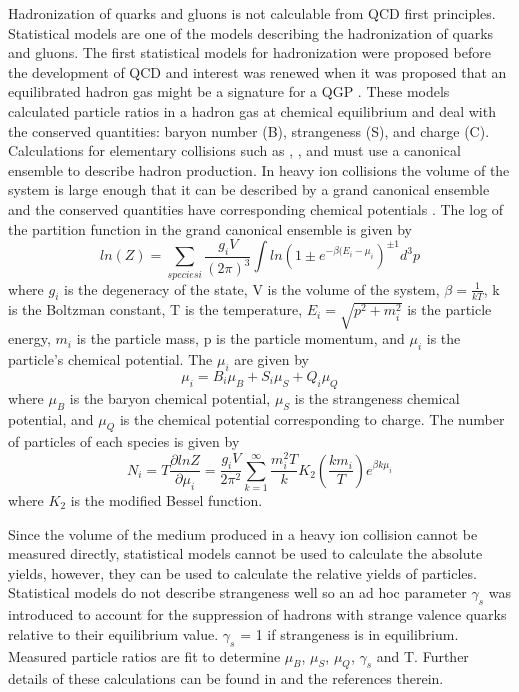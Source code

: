 Hadronization of quarks and gluons is not calculable from QCD first principles.  Statistical models are one of the models describing the hadronization of quarks and gluons.  The first statistical models for hadronization were proposed before the development of QCD and interest was renewed when it was proposed that an equilibrated hadron gas might be a signature for a QGP \cite{Becattini:2009sc}.  These models calculated particle ratios in a hadron gas at chemical equilibrium and deal with the conserved quantities: baryon number (B), strangeness (S), and charge (C).  Calculations for elementary collisions such as \ee, \pp, and \ppbar must use a canonical ensemble to describe hadron production.  In heavy ion collisions the volume of the system is large enough that it can be described by a grand canonical ensemble and the conserved quantities have corresponding chemical potentials \cite{Wheaton:2004qb}.  The log of the partition function in the grand canonical ensemble is given by 
\begin{equation}
 ln(Z) = \sum_{species i} \frac{g_i V}{(2\pi)^3} \int  ln(1 \pm e^{-\beta (E_i-\mu_i})^{\pm 1} d^3 p
\end{equation}
where $g_i$ is the degeneracy of the state, V is the volume of the system, $\beta = \frac{1}{kT}$, k is the Boltzman constant, T is the temperature, $E_i = \sqrt{p^2+m_i^2}$ is the particle energy, $m_i$ is the particle mass, p is the particle momentum, and $\mu_i$ is the particle's chemical potential.  The $\mu_i$ are given by
\begin{equation}
 \mu_i = B_i \mu_B + S_i \mu_S + Q_i \mu_Q
\end{equation}
where $\mu_B$ is the baryon chemical potential, $\mu_S$ is the strangeness chemical potential, and $\mu_Q$ is the chemical potential corresponding to charge.  The number of particles of each species is given by
\begin{equation}
 N_i = T \frac{\partial ln Z}{\partial \mu_i} = \frac{g_i V}{2 \pi^2} \sum^{\infty}_{k=1}  \frac{m_i^2 T}{k} K_2 (\frac{km_i}{T}) e^{\beta k \mu_i}
\end{equation}
where $K_2$ is the modified Bessel function.

Since the volume of the medium produced in a heavy ion collision cannot be measured directly, statistical models cannot be used to calculate the absolute yields, however, they can be used to calculate the relative yields of particles.  Statistical models do not describe strangeness well so an ad hoc parameter $\gamma_s$ was introduced to account for the suppression of hadrons with strange valence quarks relative to their equilibrium value.  $\gamma_s$ = 1 if strangeness is in equilibrium.  Measured particle ratios are fit to determine $\mu_B$, $\mu_S$, $\mu_Q$, $\gamma_s$ and T.  Further details of these calculations can be found in \cite{Becattini:2009sc} and the references therein.

